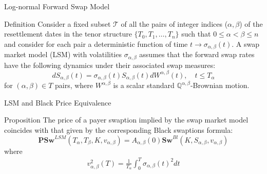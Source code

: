 \documentclass{beamer}
\begin{document}
\begin{frame}{Log-normal Forward Swap Model}
  \begin{block}{Definition}
    Consider a fixed subset $\mathcal{T}$ of all the pairs of integer indices ($\alpha, \beta$) of the resettlement dates in the tenor structure $\{T_0, T_1,\ldots, T_n\}$ such that $0 \leq \alpha < \beta \leq n$ and consider for each pair a deterministic function of time $t\rightarrow \sigma_{\alpha,\beta}(t)$. A swap market model (LSM) with volatilities $\sigma_{\alpha,\beta}$ assumes that the forward swap rates have the following dynamics under their associated swap measures:
    \begin{equation}
      dS_{\alpha,\beta}(t) = \sigma_{\alpha,\beta}(t)S_{\alpha,\beta}(t)dW^{\alpha,\beta}(t),\quad t \leq T_\alpha
      \label{eq:swap_rate_dynamics}
    \end{equation}
    for $(\alpha, \beta) \in T$ pairs, where $W^{\alpha,\beta}$ is a scalar standard $\mathbb{Q}^{\alpha,\beta}$-Brownian motion.
  \end{block}
\end{frame}

\begin{frame}{LSM and Black Price Equivalence}
  \begin{block}{Proposition}
    The price of a payer swaption implied by the swap market model coincides with that given by the corresponding Black swaptions formula:
    \begin{equation}
      \textbf{PSw}^{LSM}(T_\alpha,T_\beta,K,v_{\alpha,\beta})=
      A_{\alpha, \beta}(0) \textbf{Sw}^{Bl}(K,S_{\alpha,\beta}, v_{\alpha,\beta})
      \label{eq:black_swaptions}
    \end{equation}
    where 
	\begin{equation*}    
		\begin{gathered}	 
   		v_{\alpha,\beta}^2(T) =\frac{1}{T_\alpha}\int_0^T\sigma_{\alpha,\beta}(t)^2dt 	
   		\end{gathered}
    \end{equation*}
  \end{block}
\end{frame}
\end{document}
